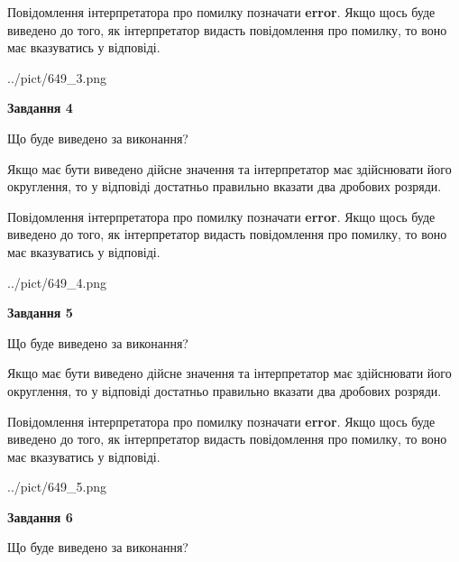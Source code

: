 \documentclass[12pt, ukrainian]{article}
\begin{document}
{\begin {Large}
Повідомлення інтерпретатора про помилку позначати \textbf{error}.
Якщо щось буде виведено до того, як інтерпретатор видасть повідомлення про помилку, 
то воно має вказуватись у відповіді. \par

\begin{center}
	{../pict/649_3.png}
\end{center}
\newpage

{\begin {center}\textbf{Завдання 4}\end {center}}\par
Що буде виведено за виконання? \par

Якщо має бути виведено дійсне значення та інтерпретатор має здійснювати його округлення, 
то у відповіді достатньо правильно вказати два дробових розряди.

Повідомлення інтерпретатора про помилку позначати \textbf{error}.
Якщо щось буде виведено до того, як інтерпретатор видасть повідомлення про помилку, 
то воно має вказуватись у відповіді. \par

\begin{center}
	{../pict/649_4.png}
\end{center}
\newpage

{\begin {center}\textbf{Завдання 5}\end {center}}\par
Що буде виведено за виконання? \par

Якщо має бути виведено дійсне значення та інтерпретатор має здійснювати його округлення, 
то у відповіді достатньо правильно вказати два дробових розряди.

Повідомлення інтерпретатора про помилку позначати \textbf{error}.
Якщо щось буде виведено до того, як інтерпретатор видасть повідомлення про помилку, 
то воно має вказуватись у відповіді. \par

\begin{center}
	{../pict/649_5.png}
\end{center}
\newpage

{\begin {center}\textbf{Завдання 6}\end {center}}\par
Що буде виведено за виконання? \par


\end{Large}}
\end{document}
